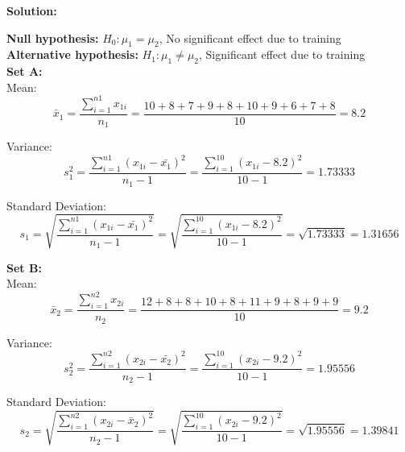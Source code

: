 \documentclass[a4paper,11pt,openright]{report}
\begin{document}
\begin{enumerate}
\textbf{Solution:}

\textbf{Null hypothesis:} $H_{0}: \mu_{1} = \mu_{2}$, \hspace{2px} No significant effect due
to training \\
\textbf{Alternative hypothesis:} $H_{1}: \mu_{1} \neq \mu_{2}$, \hspace{2px} Significant
effect due to training \\

\textbf{Set A:} \\ 
\hspace*{10mm} Mean:
\begin{equation*}
\bar x_{1} = \frac{\sum\limits_{i=1}^{n1} x_{1i}}{n_{1}}
    	= \frac{10 + 8 + 7 + 9 + 8 + 10 + 9 + 6 + 7 + 8}{10}
    	= 8.2
\end{equation*}

\hspace*{10mm} Variance:
\begin{equation*}
s_{1}^{2} = \frac{\sum\limits_{i=1}^{n1} (x_{1i} - \bar {x_{1}})^{2}}{n_{1} - 1}
		= \frac{\sum\limits_{i=1}^{10} (x_{1i} - 8.2)^{2}}{10 -1} = 1.73333
\end{equation*}

\hspace*{10mm} Standard Deviation:
\begin{equation*}
s_{1} = \sqrt{\frac{\sum\limits_{i=1}^{n1} (x_{1i} - \bar {x_{1}})^{2}}{n_{1} - 1}}
	= \sqrt{\frac{\sum\limits_{i=1}^{10} (x_{1i} - 8.2)^{2}}{10 -1}}
	= \sqrt{1.73333} = 1.31656
\end{equation*}

\textbf{Set B:} \\
\hspace*{10mm} Mean:
\begin{equation*}
\bar x_{2} = \frac{\sum\limits_{i=1}^{n2} x_{2i}}{n_{2}}
	= \frac{12 + 8 + 8 + 10 + 8 + 11 + 9 + 8 + 9 + 9}{10}
	= 9.2
\end{equation*}

\hspace*{10mm} Variance:
\begin{equation*}
s_{2}^{2} = \frac{\sum\limits_{i=1}^{n2} (x_{2i} - \bar {x_{2}})^{2}}{n_{2} - 1}
= \frac{\sum\limits_{i=1}^{10} (x_{2i} - 9.2)^{2}}{10 -1} = 1.95556
\end{equation*}

\hspace*{10mm} Standard Deviation:
\begin{equation*}
s_{2} = \sqrt{\frac{\sum\limits_{i=1}^{n2} (x_{2i} - \bar x_{2})^{2}}{n_{2} - 1}}
= \sqrt{\frac{\sum\limits_{i=1}^{10} (x_{2i} - 9.2)^{2}}{10 -1}}
= \sqrt{1.95556} = 1.39841
\end{equation*}


\end{enumerate}
\end{document}
